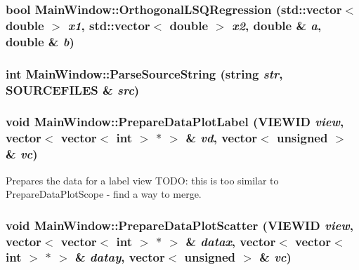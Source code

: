 \hypertarget{class_main_window_a9256553e6e0c80924a6777e4afa8971}{
\subsubsection[{OrthogonalLSQRegression}]{\setlength{\rightskip}{0pt plus 5cm}bool MainWindow::OrthogonalLSQRegression (std::vector$<$ double $>$ {\em x1}, \/  std::vector$<$ double $>$ {\em x2}, \/  double \& {\em a}, \/  double \& {\em b})}}
\label{class_main_window_a9256553e6e0c80924a6777e4afa8971}


\hypertarget{class_main_window_165581a8c1eed85fce4920110a661d8b}{
\subsubsection[{ParseSourceString}]{\setlength{\rightskip}{0pt plus 5cm}int MainWindow::ParseSourceString (string {\em str}, \/  {\bf SOURCEFILES} \& {\em src})}}
\label{class_main_window_165581a8c1eed85fce4920110a661d8b}


\hypertarget{class_main_window_744f2ed4507c6639ddbfc3473b74abb7}{
\subsubsection[{PrepareDataPlotLabel}]{\setlength{\rightskip}{0pt plus 5cm}void MainWindow::PrepareDataPlotLabel ({\bf VIEWID} {\em view}, \/  vector$<$ vector$<$ int $>$ $\ast$ $>$ \& {\em vd}, \/  vector$<$ unsigned $>$ \& {\em vc})}}
\label{class_main_window_744f2ed4507c6639ddbfc3473b74abb7}


Prepares the data for a label view TODO: this is too similar to PrepareDataPlotScope - find a way to merge. 

\hypertarget{class_main_window_c8a412fbe071fe068e408efbf6206089}{
\subsubsection[{PrepareDataPlotScatter}]{\setlength{\rightskip}{0pt plus 5cm}void MainWindow::PrepareDataPlotScatter ({\bf VIEWID} {\em view}, \/  vector$<$ vector$<$ int $>$ $\ast$ $>$ \& {\em datax}, \/  vector$<$ vector$<$ int $>$ $\ast$ $>$ \& {\em datay}, \/  vector$<$ unsigned $>$ \& {\em vc})}}
\label{class_main_window_c8a412fbe071fe068e408efbf6206089}


